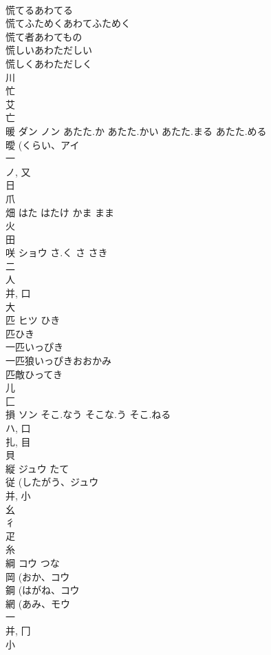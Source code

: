 \documentclass[8pt]{extreport}
\begin{document}
\begin{CJK}{UTF8}{min}
\\	慌てるあわてる 
\\	慌てふためくあわてふためく 
\\	慌て者あわてもの 
\\	慌しいあわただしい 
\\	慌しくあわただしく 
\\	川 
\\	忙 
\\	艾 
\\	亡 
\\	暖	ダン ノン	あたた.か あたた.かい あたた.まる あたた.める	
\\	曖 (くらい、アイ 
\\	一 
\\	ノ, 又 
\\	日 
\\	爪 
\\	畑		はた はたけ かま まま	
\\	火 
\\	田 
\\	咲	ショウ	さ.く さ さき	
\\	二 
\\	人 
\\	并, 口 
\\	大 
\\	匹	ヒツ	ひき	
\\	匹ひき
\\	一匹いっぴき
\\	一匹狼いっぴきおおかみ
\\	匹敵ひってき
\\	儿 
\\	匚 
\\	損	ソン	そこ.なう そこな.う そこ.ねる	
\\	ハ, 口 
\\	扎, 目 
\\	貝 
\\	縦	ジュウ	たて	
\\	従 (したがう、ジュウ 
\\	并, 小 
\\	幺 
\\	彳 
\\	疋 
\\	糸 
\\	綱	コウ	つな	
\\	岡 (おか、コウ 
\\	鋼 (はがね、コウ 
\\	網 (あみ、モウ 
\\	一 
\\	并, 冂 
\\	小 

\end{CJK}
\end{document}
